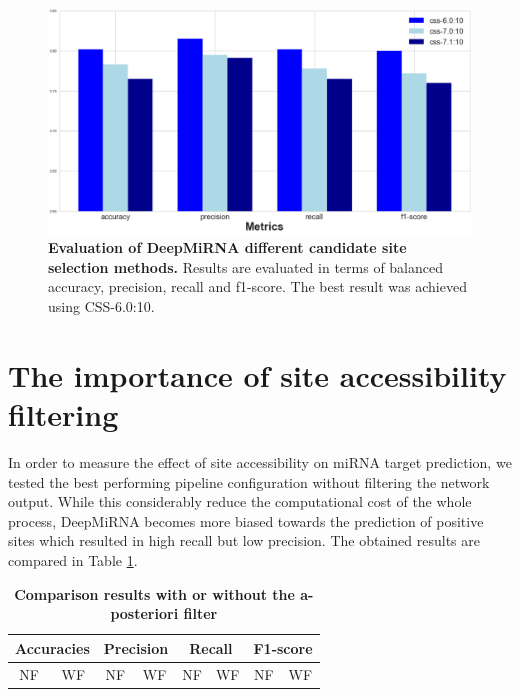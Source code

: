 \begin{figure}[hbt!]
	\centering
	\includegraphics[width=\textwidth]{Figures/cssm_evaluation}
	\caption{\textbf{Evaluation of DeepMiRNA different candidate site selection methods.} Results are evaluated in terms of balanced accuracy, precision, recall and f1-score. The best result was achieved using CSS-6.0:10.}
	\label{fig:cssm}
\end{figure}

\section{The importance of site accessibility filtering}
In order to measure the effect of site accessibility on miRNA target prediction, we tested the best performing pipeline configuration without filtering the network output. While this considerably reduce the computational cost of the whole process, DeepMiRNA becomes more biased towards the prediction of positive sites which resulted in high recall but low precision. The obtained results are compared in Table \ref{tab:sa_filter}.     

\begin{table}
	\caption{\textbf{Comparison results with or without the a-posteriori filter}}
	\label{tab:sa_filter}
	\centering
	\begin{tabular}{| c | c | c | c | c | c | c | c |} \hline
		\multicolumn{2}{|c|}{Accuracies} & \multicolumn{2}{c|}{Precision} & \multicolumn{2}{c|}{Recall} & \multicolumn{2}{c|}{F1-score} \\ \hline 
		NF & WF & NF & WF & NF & WF & NF & WF \\ \hline
		
		
	\end{tabular}
\end{table}
